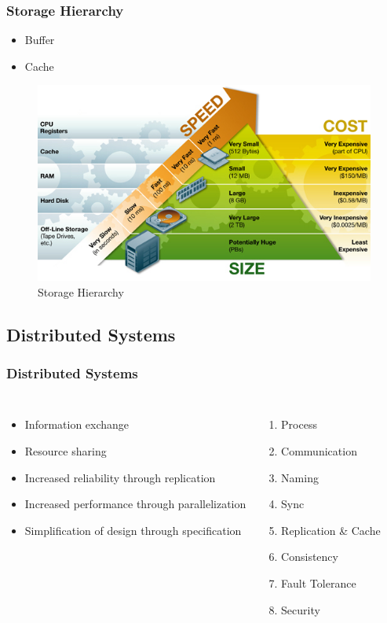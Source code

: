 \begin{frame}
  \frametitle{Storage Hierarchy}
  \begin{itemize}
    \item \alert{Buffer}
    \item \alert{Cache}
  \end{itemize}

  \begin{figure}
    \centering\includegraphics[scale=.5]{images/storage_hierarchy.jpg}
    \caption{Storage Hierarchy}
  \end{figure}
\end{frame}

\subsection{Distributed Systems}
\begin{frame}
  \frametitle{Distributed Systems}
  \begin{columns}[t]
    \begin{itemize}
      \item Information exchange
      \item Resource sharing
      \item Increased reliability through replication
      \item Increased performance through parallelization
      \item Simplification of design through specification
    \end{itemize}
      \begin{enumerate}
        \item Process
        \item Communication
        \item Naming
        \item Sync
        \item Replication \& Cache
        \item Consistency
        \item Fault Tolerance
        \item Security
      \end{enumerate}
  \end{columns}
\end{frame}

